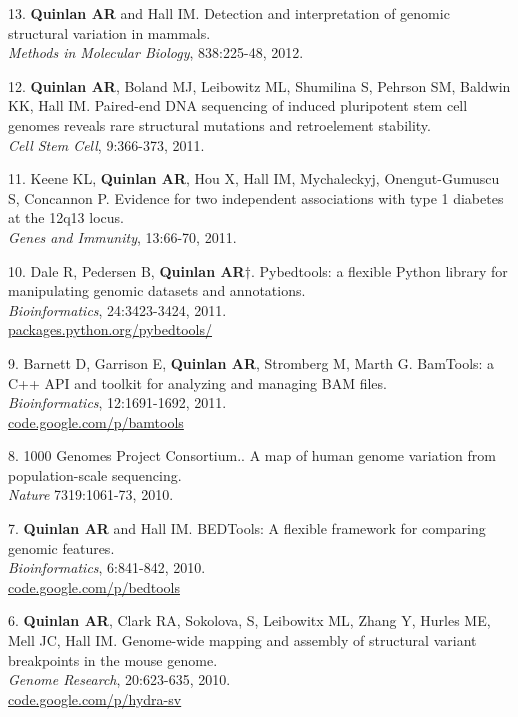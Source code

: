 \documentclass[margin,line]{cv}
\begin{document}
\begin{resume}
\begin{list}{*}{}
    \item[13.] \textbf{Quinlan AR} and Hall IM. 
    Detection and interpretation of genomic structural variation in mammals.\\
    \textit{Methods in Molecular Biology}, 838:225-48, 2012.
   
    \item[12.] \textbf{Quinlan AR}, Boland MJ, Leibowitz ML, Shumilina S, Pehrson SM, Baldwin KK, Hall IM. 
    Paired-end DNA sequencing of induced pluripotent stem cell genomes reveals 
    rare structural mutations and retroelement stability.\\
    \textit{Cell Stem Cell}, 9:366-373, 2011.
    
    \item[11.] Keene KL, \textbf{Quinlan AR}, Hou X, Hall IM, Mychaleckyj, Onengut-Gumuscu S, Concannon P.
    Evidence for two independent associations with type 1 diabetes at the 12q13 locus.\\
    \textit{Genes and Immunity}, 13:66-70, 2011.

    \item[10.] Dale R, Pedersen B, \textbf{Quinlan AR}$\dagger$. 
    Pybedtools: a flexible Python library for manipulating genomic datasets and annotations.\\
    \textit{Bioinformatics}, 24:3423-3424, 2011.\\
    \url{packages.python.org/pybedtools/}
    
    \item[9.] Barnett D, Garrison E, \textbf{Quinlan AR}, Stromberg M, Marth G.
    BamTools: a C++ API and toolkit for analyzing and managing BAM files.\\
    \textit{Bioinformatics}, 12:1691-1692, 2011.\\
    \url{code.google.com/p/bamtools}

    \item[8.] 1000 Genomes Project Consortium.. 
    A map of human genome variation from population-scale sequencing.\\ 
    \textit{Nature} 7319:1061-73, 2010.

    \item[7.] \textbf{Quinlan AR} and Hall IM.
    BEDTools: A flexible framework for comparing genomic features.\\ 
    \textit{Bioinformatics}, 6:841-842, 2010.\\
    \url{code.google.com/p/bedtools}

    \item[6.] \textbf{Quinlan AR}, Clark RA, Sokolova, S, Leibowitx ML, Zhang Y, Hurles ME, Mell JC, Hall IM. 
    Genome-wide mapping and assembly of structural variant breakpoints in the mouse genome.\\
    \textit{Genome Research}, 20:623-635, 2010.\\
    \url{code.google.com/p/hydra-sv}


\end{list}
\end{resume}
\end{document}
